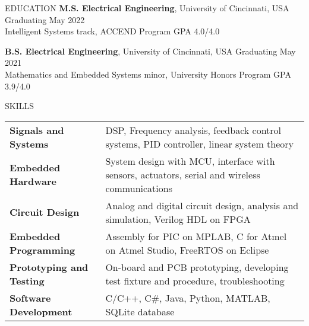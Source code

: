 \documentclass{../lib/resume} %
\begin{document}
	


	
	\begin{rSection}{EDUCATION}
		{\bf M.S. Electrical Engineering}, University of Cincinnati, USA \hfill {Graduating May 2022} \\
		Intelligent Systems track, ACCEND Program \hfill GPA 4.0/4.0 \smallskip
		
		{\bf B.S. Electrical Engineering}, University of Cincinnati, USA \hfill {Graduating May 2021}\\
		Mathematics and Embedded Systems minor, University Honors Program \hfill {GPA 3.9/4.0}
		
		
		
		
	\end{rSection}
	
	\begin{rSection}{SKILLS}
		
		\begin{tabular}{ @{} >{\bfseries}l @{\hspace{2ex}} l }
			Signals and Systems & DSP, Frequency analysis, feedback control systems, PID controller, linear system theory	\\
			Embedded Hardware & System design with MCU, interface with sensors, actuators, serial and wireless communications \\ 
			Circuit Design & Analog and digital circuit design, analysis and simulation, Verilog HDL on FPGA \\
			Embedded Programming & Assembly for PIC on MPLAB, C for Atmel on Atmel Studio, FreeRTOS on Eclipse \\
			Prototyping and Testing &  On-board and PCB prototyping, developing test fixture and procedure, troubleshooting	\\
			Software Development & C/C++, C\#, Java, Python, MATLAB, SQLite database \\
		\end{tabular}
	\end{rSection}
	
\end{document}
